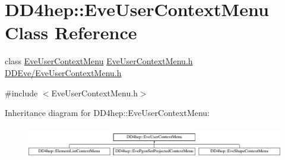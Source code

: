 \hypertarget{class_d_d4hep_1_1_eve_user_context_menu}{}\section{D\+D4hep\+:\+:Eve\+User\+Context\+Menu Class Reference}
\label{class_d_d4hep_1_1_eve_user_context_menu}


class \hyperlink{class_d_d4hep_1_1_eve_user_context_menu}{Eve\+User\+Context\+Menu} \hyperlink{_eve_user_context_menu_8h}{Eve\+User\+Context\+Menu.\+h} \hyperlink{_eve_user_context_menu_8h}{D\+D\+Eve/\+Eve\+User\+Context\+Menu.\+h}  




{\ttfamily \#include $<$Eve\+User\+Context\+Menu.\+h$>$}

Inheritance diagram for D\+D4hep\+:\+:Eve\+User\+Context\+Menu\+:\begin{figure}[H]
\begin{center}
\leavevmode
\includegraphics[height=1.387856cm]{class_d_d4hep_1_1_eve_user_context_menu}
\end{center}
\end{figure}
